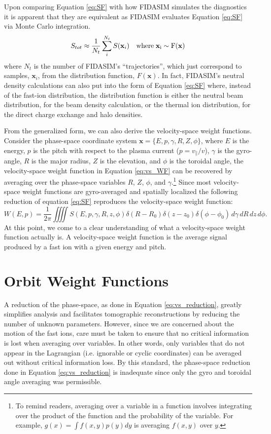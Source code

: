 Upon comparing Equation \ref{eq:SF} with how FIDASIM simulates the diagnostics it is apparent that they are equivalent as FIDASIM evaluates Equation \ref{eq:SF} via Monte Carlo integration.
\begin{equation}
    S_{tot} \approx \frac{1}{N_t} \sum_i^{N_t} S(\mathbf{x}_i)\quad \rm{where}\; \mathbf{x}_i \sim F(\mathbf{x})
\end{equation}
where $N_t$ is the number of FIDASIM's ``trajectories'', which just correspond to samples, $\mathbf{x}_i$, from the distribution function, $F(\mathbf{x})$. In fact, FIDASIM's neutral density calculations can also put into the form of Equation \ref{eq:SF} where, instead of the fast-ion distribution, the distribution function is either the neutral beam distribution, for the beam density calculation, or the thermal ion distribution, for the direct charge exchange and halo densities.

From the generalized form, we can also derive the velocity-space weight functions.
Consider the phase-space coordinate system $\mathbf{x} = \{E,p,\gamma, R, Z, \phi\}$, where $E$ is the energy, $p$ is the pitch with respect to the plasma current ($p=v_{\parallel}/v$), $\gamma$ is the gyro-angle, $R$ is the major radius, $Z$ is the elevation, and $\phi$ is the toroidal angle, the velocity-space weight function in Equation \ref{eq:vs_WF} can be recovered by averaging over the phase-space variables $R$, $Z$, $\phi$, and $\gamma$.\footnote{To remind readers, averaging over a variable in a function involves integrating over the product of the function and the probability of the variable. For example, $g(x) = \int f(x,y)p(y)dy$ is averaging $f(x,y)$ over $y$.}
Since most velocity-space weight functions are gyro-averaged and spatially localized the following reduction of equation \ref{eq:SF} reproduces the velocity-space weight function:
\begin{equation}\label{eq:vs_reduction}
    W(E,p) = \frac{1}{2\pi} \iiiint S(E,p,\gamma,R,z,\phi)\delta(R-R_0)\delta(z-z_0)\delta(\phi - \phi_0)\,d\gamma\, dR\, dz\, d\phi.
\end{equation}
At this point, we come to a clear understanding of what a velocity-space weight function actually is. A velocity-space weight function is the average signal produced by a fast ion with a given energy and pitch. 

\section{Orbit Weight Functions}\label{sec:orbit_weight}
A reduction of the phase-space, as done in Equation \ref{eq:vs_reduction}, greatly simplifies analysis and facilitates tomographic reconstructions by reducing the number of unknown parameters.
However, since we are concerned about the motion of the fast ions, care must be taken to ensure that no critical information is lost when averaging over variables.
In other words, only variables that do not appear in the Lagrangian (i.e. ignorable or cyclic coordinates) can be averaged out without critical information loss.
By this standard, the phase-space reduction done in Equation \ref{eq:vs_reduction} is inadequate since only the gyro and toroidal angle averaging was permissible. 

